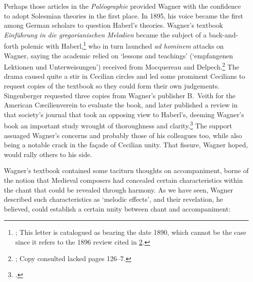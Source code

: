 Perhaps those articles in the \emph{Paléographie} provided Wagner with the confidence to adopt Solesmian theories in the first place.
In 1895, his voice became the first among German scholars to question Haberl's theories.
Wagner's textbook \emph{Einführung in die gregorianischen Melodien} became the subject of a back-and-forth polemic with Haberl,\footnote{; This letter is catalogued as bearing the date 1890, which cannot be the case since it refers to the 1896 review cited in \cref{fn:haberl_review}.} who in turn launched \emph{ad hominem} attacks on Wagner, saying the academic relied on `lessons and teachings' (`empfangenen Lektionen und Unterweisungen') received from Mocquereau and Delpech.\footnote{\cite[123]{HaberlReviewEinfuehrunggregorianischen1896}; Copy consulted lacked pages 126--7.\label{fn:haberl_review}}
The drama caused quite a stir in Cecilian circles and led some prominent Cecilians to request copies of the textbook so they could form their own judgements.
Singenberger requested three copies from Wagner's publisher B.\ Veith for the American Cæcilienverein to evaluate the book, and later published a review in that society's journal that took an opposing view to Haberl's, deeming Wagner's book an important study wrought of thoroughness and clarity.\footcite[4]{NeuePublikationen1896}
The support assuaged Wagner's concerns and probably those of his colleagues too, while also being a notable crack in the façade of Cecilian unity.
That fissure, Wagner hoped, would rally others to his side.

%
Wagner's textbook contained some taciturn thoughts on accompaniment, borne of the notion that Medieval composers had concealed certain characteristics within the chant that could be revealed through harmony.
As we have seen, Wagner described such characteristics as `melodic effects', and their revelation, he believed, could establish a certain unity between chant and accompaniment:
\nowidow[2]

